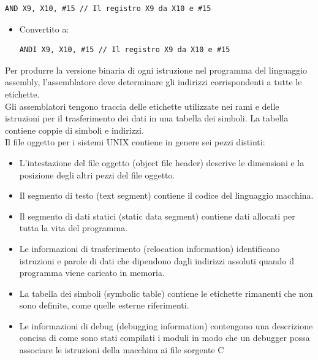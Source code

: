 \documentclass[12pt,a4paper]{article}
\begin{document}
\begin{verbatim}
AND X9, X10, #15 // Il registro X9 da X10 e #15
\end{verbatim}
\begin{itemize}
\item Convertito a: \begin{minipage}{.2\linewidth}
\begin{verbatim}
ANDI X9, X10, #15 // Il registro X9 da X10 e #15
\end{verbatim}
\end{minipage}
\end{itemize}
Per produrre la versione binaria di ogni istruzione nel programma del linguaggio assembly, l'assemblatore deve determinare gli indirizzi corrispondenti a tutte le etichette.\\
Gli assemblatori tengono traccia delle etichette utilizzate nei rami e delle istruzioni per il trasferimento dei dati in una tabella dei simboli. La tabella contiene coppie di simboli e indirizzi.\\
Il file oggetto per i sistemi UNIX contiene in genere sei pezzi distinti:
\begin{itemize}
\item L'intestazione del file oggetto (object file header) descrive le dimensioni e la posizione degli altri pezzi del file oggetto.
\item Il segmento di testo (text segment) contiene il codice del linguaggio macchina.
\item Il segmento di dati statici (static data segment) contiene dati allocati per tutta la vita del programma.
\item Le informazioni di trasferimento (relocation information) identificano istruzioni e parole di dati che dipendono dagli indirizzi assoluti quando il programma viene caricato in memoria.
\item La tabella dei simboli (symbolic table) contiene le etichette rimanenti che non sono definite, come quelle esterne riferimenti.
\item Le informazioni di debug (debugging information) contengono una descrizione concisa di come sono stati compilati i moduli in modo che un debugger possa associare le istruzioni della macchina ai file sorgente C
\end{itemize}
\end{document}
